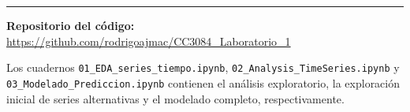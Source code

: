 \documentclass[12pt,letterpaper]{article}
\begin{document}
\vspace{1em}
\hrule
\vspace{0.6em}
{\small \textbf{Repositorio del código:}
\url{https://github.com/rodrigoajmac/CC3084_Laboratorio_1}

\vspace{0.4em}
Los cuadernos \texttt{01\_EDA\_series\_tiempo.ipynb},
\texttt{02\_Analysis\_TimeSeries.ipynb} y \texttt{03\_Modelado\_Prediccion.ipynb} contienen el
análisis exploratorio, la exploración inicial de series alternativas y el modelado completo,
respectivamente.}
\end{document}
